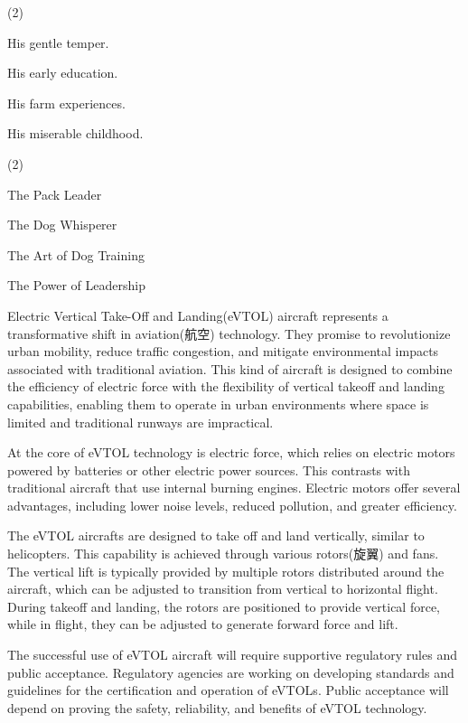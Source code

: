 \documentclass{英语试卷}
\begin{document}
\begin{choices}(2)
  \item His gentle temper.
  \item His early education.
  \item His farm experiences.
  \item His miserable childhood.
\end{choices}
\begin{choices}(2)
  \item The Pack Leader
  \item The Dog Whisperer
  \item The Art of Dog Training
  \item The Power of Leadership
\end{choices}
\par Electric Vertical Take-Off and Landing(eVTOL) aircraft represents a transformative shift in aviation(航空) technology. They promise to revolutionize urban mobility, reduce traffic congestion, and mitigate environmental impacts associated with traditional aviation. This kind of aircraft is designed to combine the efficiency of electric force with the flexibility of vertical takeoff and landing capabilities, enabling them to operate in urban environments where space is limited and traditional runways are impractical.\par
\par At the core of eVTOL technology is electric force, which relies on electric motors powered by batteries or other electric power sources. This contrasts with traditional aircraft that use internal burning engines. Electric motors offer several advantages, including lower noise levels, reduced pollution, and greater efficiency.\par
\par The eVTOL aircrafts are designed to take off and land vertically, similar to helicopters. This capability is achieved through various rotors(旋翼) and fans. The vertical lift is typically provided by multiple rotors distributed around the aircraft, which can be adjusted to transition from vertical to horizontal flight. During takeoff and landing, the rotors are positioned to provide vertical force, while in flight, they can be adjusted to generate forward force and lift.\par
\par The successful use of eVTOL aircraft will require supportive regulatory rules and public acceptance. Regulatory agencies are working on developing standards and guidelines for the certification and operation of eVTOLs. Public acceptance will depend on proving the safety, reliability, and benefits of eVTOL technology.\par
\end{document}
